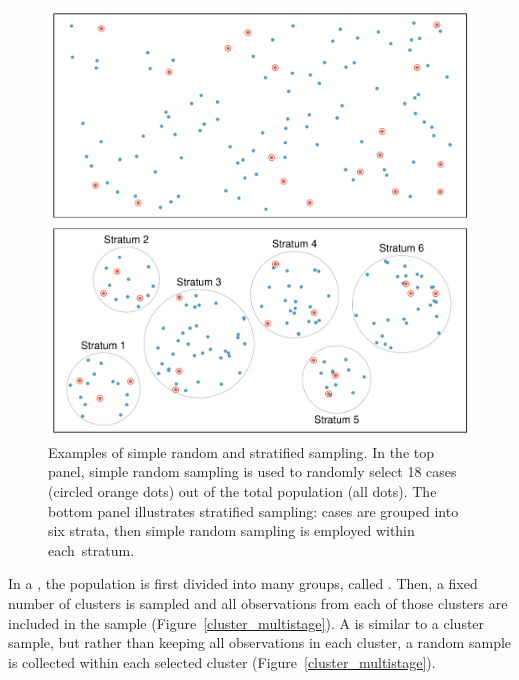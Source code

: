 \begin{figure}
	\centering
	\includegraphics[width=\textwidth]{ch_intro_to_data_oi_biostat/figures/samplingMethodsFigure/simple_stratified}
	\caption{Examples of simple random and stratified sampling. In the top panel, simple random sampling is used to randomly select 18 cases (circled orange dots) out of the total population (all dots). The bottom panel illustrates stratified sampling: cases are grouped into six strata, then simple random sampling is employed within \mbox{each stratum}.}
	\label{simple_stratified}
\end{figure}

\textD{\newpage}

In a , the population is first divided into many groups, called . Then, a fixed number of clusters is sampled and all observations from each of those clusters are included in the sample (Figure~\ref{cluster_multistage}). A  is similar to a cluster sample, but rather than keeping all observations in each cluster, a random sample is collected within each selected cluster (Figure~\ref{cluster_multistage}).

